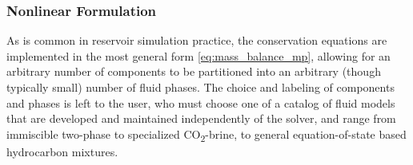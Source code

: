 \subsubsection{Nonlinear Formulation}

As is common in reservoir simulation practice, the conservation equations are implemented in the most general form \cref{eq:mass_balance_mp}, allowing for an arbitrary number of components to be partitioned into an arbitrary (though typically small) number of fluid phases.   The choice and labeling of components and phases is left to the user, who must choose one of a catalog of fluid models that are developed and maintained independently of the solver, and range from immiscible two-phase to specialized CO\textsubscript{2}-brine, to general equation-of-state based hydrocarbon mixtures.

